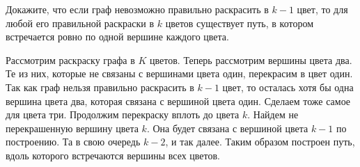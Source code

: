 \begin{task}{91}
	Докажите, что если граф невозможно правильно раскрасить в $k - 1$ цвет, то для любой его правильной раскраски в $k$ цветов существует путь, в котором встречается ровно по одной вершине каждого цвета. 
\end{task}

\begin{solution} 
    Рассмотрим раскраску графа в $K$ цветов. Теперь рассмотрим вершины цвета два. Те из них, которые не связаны с вершинами цвета один, перекрасим в цвет один. Так как граф нельзя правильно раскрасить в $k - 1$ цвет, то осталась хотя бы одна вершина цвета два, которая связана с вершиной цвета один. Сделаем тоже самое для цвета три. Продолжим перекраску вплоть до цвета $k$. Найдем не перекрашенную вершину цвета $k$. Она будет связана с вершиной цвета $k - 1$ по построению. Та в свою очередь  $k - 2$, и так далее. Таким образом построен путь, вдоль которого встречаются вершины всех цветов.
\end{solution}